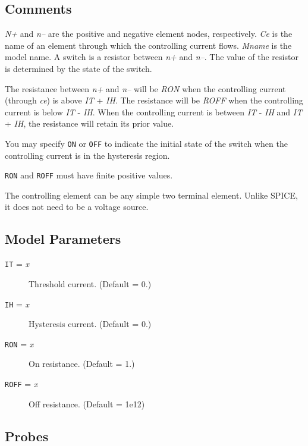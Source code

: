 \subsection{Comments}

{\it N+} and {\it n--} are the positive and negative element nodes,
respectively.  {\it Ce} is the name of an element through which
the controlling current flows.  {\it Mname} is the model name.  A
switch is a resistor between {\it n+} and {\it n--}.  The value of
the resistor is determined by the state of the switch.

The resistance between {\it n+} and {\it n--} will be {\it RON}
when the controlling current (through {\it ce}) is above {\it IT}
+ {\it IH}.  The resistance will be {\it ROFF} when the controlling
current is below {\it IT} - {\it IH}.  When the controlling current
is between {\it IT} - {\it IH} and {\it IT} + {\it IH}, the resistance
will retain its prior value.

You may specify {\tt ON} or {\tt OFF} to indicate the initial state
of the switch when the controlling current is in the hysteresis
region.

{\tt RON} and {\tt ROFF} must have finite positive values.

The controlling element can be any simple two terminal element.
Unlike SPICE, it does not need to be a voltage source.
\subsection{Model Parameters}

\begin{description}

\item[{\tt IT} = {\it x}] Threshold current.  (Default = 0.)

\item[{\tt IH} = {\it x}] Hysteresis current.  (Default = 0.)

\item[{\tt RON} = {\it x}] On resistance.  (Default = 1.)

\item[{\tt ROFF} = {\it x}] Off resistance.  (Default = 1e12)

\end{description}
\subsection{Probes}

